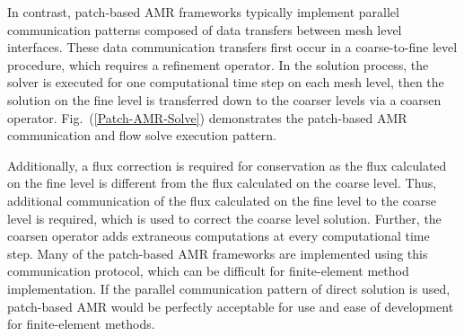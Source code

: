 \documentclass[11pt]{book}
\begin{document}
In contrast, patch-based AMR frameworks typically implement parallel communication 
patterns composed of data transfers between mesh level interfaces. 
These data communication transfers first occur in a coarse-to-fine level procedure, 
which requires a refinement operator. In the solution process, the solver is executed for 
one computational time step on each mesh level, then the solution on the fine level 
is transferred down to the coarser levels via a coarsen operator. Fig.~(\ref{Patch-AMR-Solve}) 
demonstrates the patch-based AMR communication and flow solve execution pattern.
\medskip

Additionally, a flux correction is required for conservation as the flux calculated 
on the fine level is different from the flux calculated on the coarse level. 
Thus, additional communication of the flux calculated on the fine level to the 
coarse level is required, which is used to correct the coarse level solution. 
Further, the coarsen operator adds extraneous computations at every computational 
time step. Many of the patch-based AMR frameworks are implemented using this communication 
protocol, which can be difficult for finite-element method implementation. 
If the parallel communication pattern of direct solution is used, patch-based AMR 
would be perfectly acceptable for use and ease of development for finite-element methods.
\bigskip
\end{document}
